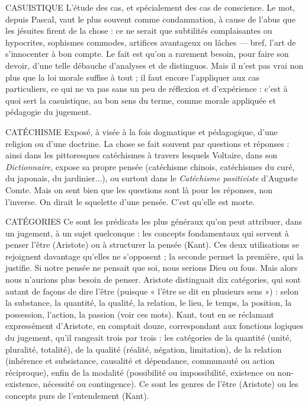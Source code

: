 CASUISTIQUE L'étude des cas, et spécialement des cas de conscience. Le
mot, depuis Pascal, vaut le plus souvent comme condamnation,
à cause de l’abus que les jésuites firent de la chose : ce ne serait que subtilités
complaisantes ou hypocrites, sophismes commodes, artifices avantageux
ou lâches — bref, l’art de s’innocenter à bon compte. Le fait est qu’on a rarement
besoin, pour faire son devoir, d’une telle débauche d’analyses et de distinguos.
Mais il n’est pas vrai non plus que la loi morale suffise à tout ; il faut
encore l’appliquer aux cas particuliers, ce qui ne va pas sans un peu de réflexion
et d'expérience : c’est à quoi sert la casuistique, au bon sens du terme, comme
morale appliquée et pédagogie du jugement.

CATÉCHISME Exposé, à visée à la fois dogmatique et pédagogique, d’une
religion ou d’une doctrine. La chose se fait souvent par questions
et réponses : ainsi dans les pittoresques catéchismes à travers lesquels Voltaire,
dans son {\it Dictionnaire}, expose sa propre pensée (catéchisme chinois, catéchismes
du curé, du japonais, du jardinier...), ou surtout dans le {\it Catéchisme
positiviste} d’Auguste Comte. Mais on sent bien que les questions sont là pour
les réponses, non l'inverse. On dirait le squelette d’une pensée. C’est qu’elle est
morte.

CATÉGORIES Ce sont les prédicats les plus généraux qu’on peut attribuer,
dans un jugement, à un sujet quelconque : les concepts fondamentaux
qui servent à penser l’être (Aristote) ou à structurer la pensée
(Kant). Ces deux utilisations se rejoignent davantage qu’elles ne s’opposent ; la
seconde permet la première, qui la justifie. Si notre pensée ne pensait que soi,
nous serions Dieu ou fous. Mais alors nous n’aurions plus besoin de penser.
Aristote distinguait dix catégories, qui sont autant de façons de dire l’être
(puisque « l'être se dit en plusieurs sens ») : selon la substance, la quantité, la
qualité, la relation, le lieu, le temps, la position, la possession, l’action, la passion
(voir ces mots). Kant, tout en se réclamant expressément d’Aristote, en
comptait douze, correspondant aux fonctions logiques du jugement, qu’il rangeait
trois par trois : les catégories de la quantité (unité, pluralité, totalité), de
la qualité (réalité, négation, limitation), de la relation (inhérence et subsistance,
causalité et dépendance, communauté ou action réciproque), enfin de la modalité
(possibilité ou impossibilité, existence ou non-existence, nécessité ou
contingence). Ce sont les genres de l’être (Aristote) ou les concepts purs de
l’entendement (Kant).

